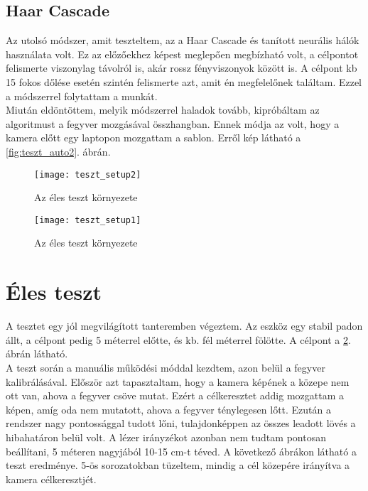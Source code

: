 \subsection*{Haar Cascade}
Az utolsó módszer, amit teszteltem, az a Haar Cascade és tanított neurális hálók használata volt. Ez az előzőekhez képest meglepően megbízható volt, a célpontot felismerte viszonylag távolról is, akár rossz fényviszonyok között is. A célpont kb 15 fokos dőlése esetén szintén felismerte azt, amit én megfelelőnek találtam. Ezzel a módszerrel folytattam a munkát. \\

Miután eldöntöttem, melyik módszerrel haladok tovább, kipróbáltam az algoritmust a fegyver mozgásával összhangban. Ennek módja az volt, hogy a kamera előtt egy laptopon mozgattam a sablon. Erről kép látható a \ref{fig:teszt_auto2}. ábrán.

\pagebreak

\begin{figure}[h!]
	\centering
	\texttt{[image: teszt\_setup2]}
	\caption{Az éles teszt környezete}
	\label{fig:teszt_teszt_setup1}
\end{figure}

\begin{figure}[h!]
	\centering
	\texttt{[image: teszt\_setup1]}
	\caption{Az éles teszt környezete}
	\label{fig:teszt_teszt_setup2}
\end{figure}

\pagebreak

\section{Éles teszt}
A tesztet egy jól megvilágított tanteremben végeztem. Az eszköz egy stabil padon állt, a célpont pedig 5 méterrel előtte, és kb. fél méterrel fölötte. A célpont a \ref{fig:teszt_teszt_setup2}. ábrán látható.\\

A teszt során a manuális működési móddal kezdtem, azon belül a fegyver kalibrálásával. Először azt tapasztaltam, hogy a kamera képének a közepe nem ott van, ahova a fegyver csöve mutat. Ezért a célkeresztet addig mozgattam a képen, amíg oda nem mutatott, ahova a fegyver ténylegesen lőtt. Ezután a rendszer nagy pontossággal tudott lőni, tulajdonképpen az összes leadott lövés a hibahatáron belül volt. A lézer irányzékot azonban nem tudtam pontosan beállítani, 5 méteren nagyjából 10-15 cm-t téved. A következő ábrákon látható a teszt eredménye. 5-ös sorozatokban tüzeltem, mindig a cél közepére irányítva a kamera célkeresztjét. \\

